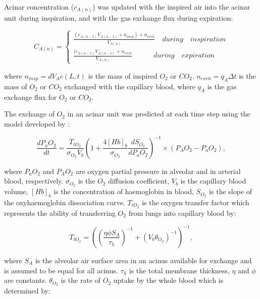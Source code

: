 Acinar concentration ($c_{A(n)}$) was updated with the inspired air into the acinar unit during inspiration, and with the gas exchange flux during expiration:

\begin{equation} 
 \label{eq:TracheaFlow}
 C_{A(n)} = \begin{cases}
 \frac{(c_{A(n-1)}V_{A(n-1)} + n_{insp}) + n_{exch}}{V_{A(n)}} \quad during \quad inspiration\\
 \frac{(c_{A(n-1)}V_{A(n-1)} + n_{exch}}{V_{A(n)}} \quad\quad\quad during \quad expiration
 \end{cases}
\end{equation}

\noindent where $n_{insp} = dV_A c(L,t)$ is the mass of inspired $O_2$ or $CO_2$. $n_{exch} = q_A \Delta t$ is the mass of $O_2$ or $CO_2$ exchanged with the capillary blood, where $q_A$ is the gas exchange flux for $O_2$ or $CO_2$.

The exchange of $O_2$ in an acinar unit was predicted at each time step using the model developed by \cite{ben2006simplified, swan2010evidence, swan2010multi}:

\begin{equation} 
 \label{eq:O2ExchangeEquation}
 \frac{dP_aO_2}{dt} = \frac{T_{tO_2}}{\sigma_{O_2} V_b}{(1 + \frac{4[Hb]_b}{\sigma_{O_2}}\frac{dS_{O_2}}{dP_a O_2})}^{-1} \times (P_A O_2 - P_a O_2),
\end{equation}

\noindent where $P_a O_2$ and $P_A O_2$ are oxygen partial pressure in alveolar and in arterial blood, respectively. $\sigma_{O_2}$ is the $O_2$ diffusion coefficient, $V_b$ is the capillary blood volume, $[Hb]_b$ is the concentration of haemoglobin in blood, $S_{O_2}$ is the slope of the oxyhaemoglobin dissociation curve. $T_{tO_2}$ is the oxygen transfer factor which represents the ability of transferring $O_2$ from lungs into capillary blood by:

\begin{equation} 
 \label{eq:O2TransferFactor}
 T_{tO_2} = ((\frac{\eta\phi S_A}{\tau_h})^{-1} + (V_b \theta_{O_2})^{-1})^{-1},
\end{equation}

\noindent where $S_A$ is the alveolar air surface area in an acinus available for exchange and is assumed to be equal for all acinus. $\tau_h$ is the total membrane thickness, $\eta$ and $\phi$ are constants. $\theta_{O_2}$ is the rate of $O_2$ uptake by the whole blood which is determined by:


